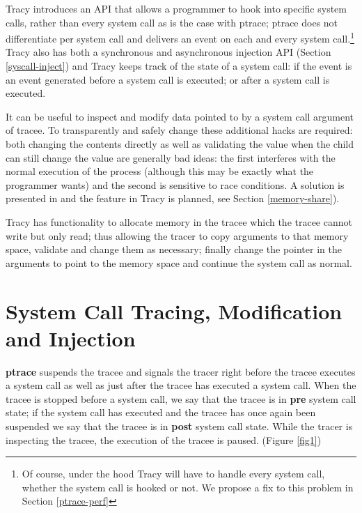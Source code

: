 \documentclass[a4paper, 10pt]{report}
\begin{document}
Tracy introduces an API that allows a programmer to hook into specific system
calls, rather than every system call as is the case with ptrace; ptrace does
not differentiate per system call and delivers an event on each and every
system call.\footnote{Of course, under the hood Tracy will have to handle
    every system call, whether the system call is hooked or not. We propose
    a fix to this problem in Section \ref{ptrace-perf}}
Tracy also has both a synchronous and asynchronous injection API
(Section \ref{syscall-inject}) and Tracy keeps
track of the state of a system call: if the event is an event generated before
a system call is executed; or after a system call is executed.

It can be useful to inspect and modify data pointed to by a system call
argument of tracee.
To transparently and safely change these additional hacks are required:
both changing the contents directly as well as validating the value when the
child can still change the value are generally bad ideas:
the first interferes with the normal execution of the process
(although this may be exactly what the programmer wants) and the second is
sensitive to race conditions. A solution is presented in
\cite{Noordende_asecure} and the feature in Tracy is planned, see Section
\ref{memory-share}).

Tracy has functionality to allocate memory in the tracee which
the tracee cannot write but only read; thus allowing the tracer
to copy arguments to that memory space, validate and change them as
necessary; finally change the pointer in the arguments to point to the memory
space and continue the system call as normal.

\section{System Call Tracing, Modification and Injection}

\textbf{ptrace} suspends the tracee and signals the tracer right before
the tracee executes a system call as well as just after the tracee has
executed a system call. When the tracee is stopped before a system call,
we say that the tracee is in \textbf{pre} system call state; if the system
call has executed and the tracee has once again
been suspended we say that the tracee is in \textbf{post} system call state.
While the tracer is inspecting the tracee, the execution of the
tracee is paused. (Figure \ref{fig1})
\end{document}
